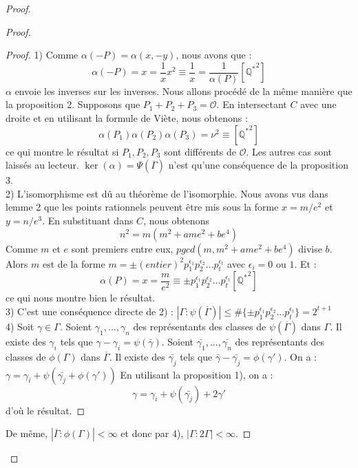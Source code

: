 \documentclass[a4paper]{article}
\begin{document}
\begin{proof}
\begin{proof}
\begin{proof}
1) Comme $\alpha(-P)=\alpha(x,-y)$, nous avons que : 
\begin{equation*}
\alpha(-P)=x=\frac{1}{x}x^2 \equiv \frac{1}{x}=\frac{1}{\alpha(P)} [\mathbb{Q^*}^2]
\end{equation*}
$\alpha$ envoie les inverses sur les inverses.
Nous allons procédé de la même manière que la proposition 2. Supposons que $ P_{1}+P_{2}+P_{3}=\mathcal{O}$. En intersectant $C$ avec une droite et en utilisant la formule de Viète, 
nous obtenons :
\begin{equation*}
\alpha(P_{1})\alpha(P_{2})\alpha(P_{3})=\nu^2 \equiv [\mathbb{Q^*}^2]
\end{equation*}
ce qui montre le résultat si $P_{1},P_{2},P_{3}$ sont différents de $\mathcal{O}$. Les autres cas sont laissés au lecteur.
$\ker(\alpha)=\Psi(\overline{\Gamma})$ n'est qu'une conséquence de la proposition 3.
\\
2) L'isomorphisme est dû au théorème de l'isomorphie.
Nous avons vus dans lemme 2 que les points rationnels peuvent être mis sous la forme $x=m/e^2$ et $y=n/e^3$. En substituant dans $C$, nous obtenons  
\begin{equation*}
n^2=m(m^2+ame^2+be^4)
\end{equation*}
Comme $m$ et $e$ sont premiers entre eux, $pgcd(m,m^2+ame^2+be^4)$ divise
$b$. Alors $m$ est de la forme $m=\pm(entier)^2p_{1}^{\epsilon_{1}}
p_{2}^{\epsilon_{2}}...p_{t}^{\epsilon_{t}}$ avec $\epsilon_{i}=0$ ou $1$. Et : 
\begin{equation*}
\alpha(P)=x=\frac{m}{e^2} \equiv \pm p_{1}^{\epsilon_{1}}
p_{2}^{\epsilon_{2}}...p_{t}^{\epsilon_{t}} [\mathbb{Q^*}^2]
\end{equation*}
ce qui nous montre bien le résultat. \\
3) C'est une conséquence directe de 2) : $|\Gamma : \psi(\overline{\Gamma})| \leqslant \# \{\pm p_{1}^{\epsilon_{1}}p_{2}^{\epsilon_{2}}...p_{t}^{\epsilon_{t}} \} = 2^{t+1}$ \\
4) Soit $\gamma \in \Gamma$. Soient $\gamma_{1},...,\gamma_{n}$ des représentants des classes de $\psi(\overline{\Gamma})$ dans $\Gamma$. 
Il existe des $\gamma_{i}$ tels que $\gamma-\gamma_{i}=\psi(\bar{\gamma})$. Soient $\bar{\gamma_{1}},...,\bar{\gamma_{n}}$ des représentants des classes de $\phi(\Gamma)$ dans $\overline{\Gamma}$.
Il existe des $\bar{\gamma_{j}}$ tels que $\bar{\gamma}-\bar{\gamma_{j}}=\phi(\gamma')$. On a : $\gamma=\gamma_{i}+\psi(\bar{\gamma_{j}}+\phi(\gamma'))$
En utilisant la proposition 1), on a :
\begin{equation*}
\gamma= \gamma_{i}+\psi(\bar{\gamma_{j}})+2\gamma'
\end{equation*}
d'où le résultat.
\end{proof}

De même, $ |\overline{\Gamma}:\phi(\Gamma)| <\infty$ et donc par 4),
$|\Gamma:2\Gamma|<\infty$. 
\end{proof}
\end{proof}
\newpage
\end{document}
